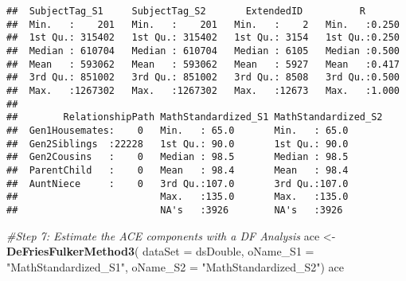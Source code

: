 \documentclass[smallextended]{svjour3}       %
\newenvironment{Shaded}{\begin{snugshade}}{\end{snugshade}}
\newcommand{\CommentTok}[1]{\textcolor[rgb]{0.56,0.35,0.01}{\textit{#1}}}
\newcommand{\DataTypeTok}[1]{\textcolor[rgb]{0.13,0.29,0.53}{#1}}
\newcommand{\DecValTok}[1]{\textcolor[rgb]{0.00,0.00,0.81}{#1}}
\newcommand{\KeywordTok}[1]{\textcolor[rgb]{0.13,0.29,0.53}{\textbf{#1}}}
\newcommand{\NormalTok}[1]{#1}
\newcommand{\OperatorTok}[1]{\textcolor[rgb]{0.81,0.36,0.00}{\textbf{#1}}}
\newcommand{\OtherTok}[1]{\textcolor[rgb]{0.56,0.35,0.01}{#1}}
\newcommand{\StringTok}[1]{\textcolor[rgb]{0.31,0.60,0.02}{#1}}
\begin{document}
\begin{Shaded}
\end{Shaded}

\begin{verbatim}
##  SubjectTag_S1     SubjectTag_S2       ExtendedID          R        
##  Min.   :    201   Min.   :    201   Min.   :    2   Min.   :0.250  
##  1st Qu.: 315402   1st Qu.: 315402   1st Qu.: 3154   1st Qu.:0.250  
##  Median : 610704   Median : 610704   Median : 6105   Median :0.500  
##  Mean   : 593062   Mean   : 593062   Mean   : 5927   Mean   :0.417  
##  3rd Qu.: 851002   3rd Qu.: 851002   3rd Qu.: 8508   3rd Qu.:0.500  
##  Max.   :1267302   Max.   :1267302   Max.   :12673   Max.   :1.000  
##                                                                     
##        RelationshipPath MathStandardized_S1 MathStandardized_S2
##  Gen1Housemates:    0   Min.   : 65.0       Min.   : 65.0      
##  Gen2Siblings  :22228   1st Qu.: 90.0       1st Qu.: 90.0      
##  Gen2Cousins   :    0   Median : 98.5       Median : 98.5      
##  ParentChild   :    0   Mean   : 98.4       Mean   : 98.4      
##  AuntNiece     :    0   3rd Qu.:107.0       3rd Qu.:107.0      
##                         Max.   :135.0       Max.   :135.0      
##                         NA's   :3926        NA's   :3926
\end{verbatim}

\begin{Shaded}
\begin{Highlighting}[]
\CommentTok{#Step 7: Estimate the ACE components with a DF Analysis}
\NormalTok{ace <-}\StringTok{ }\KeywordTok{DeFriesFulkerMethod3}\NormalTok{(}
    \DataTypeTok{dataSet  =}\NormalTok{ dsDouble,}
    \DataTypeTok{oName_S1 =} \StringTok{"MathStandardized_S1"}\NormalTok{,}
    \DataTypeTok{oName_S2 =} \StringTok{"MathStandardized_S2"}\NormalTok{)}
\NormalTok{ace}
\end{Highlighting}
\end{Shaded}
\end{document}
